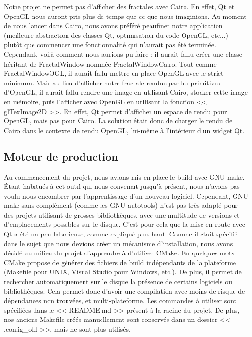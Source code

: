 \documentclass[11pt]{article}
\begin{document}
Notre projet ne permet pas d'afficher des fractales avec Cairo. En effet, Qt et
OpenGL nous auront pris plus de temps que ce que nous imaginions. Au moment de
nous lancer dans Cairo, nous avons préféré peaufiner notre application
(meilleure abstraction des classes Qt, optimisation du code OpenGL, etc...)
plutôt que commencer une fonctionnalité qui n'aurait pas été terminée.
Cependant, voilà comment nous aurions pu faire : il aurait fallu créer une
classe héritant de FractalWindow nommée FractalWindowCairo. Tout comme
FractalWindowOGL, il aurait fallu mettre en place OpenGL avec le strict minimum.
Mais au lieu d'afficher notre fractale rendue par les primitives d'OpenGL, il
aurait fallu rendre une image en utilisant Cairo, stocker cette image en
mémoire, puis l'afficher avec OpenGL en utilisant la fonction << glTexImage2D
>>. En effet, Qt permet d'afficher un espace de rendu pour OpenGL, mais pas pour
Cairo. La solution était donc de charger le rendu de Cairo dans le contexte de
rendu OpenGL, lui-même à l'intérieur d'un widget Qt.

\subsection{Moteur de production}

Au commencement du projet, nous avions mis en place le build avec GNU make.
Étant habitués à cet outil qui nous convenait jusqu'à présent, nous n'avons pas
voulu nous encombrer par l'apprentissage d'un nouveau logiciel. Cependant, GNU
make sans complément (comme les GNU autotools) n'est pas très adapté pour des
projets utilisant de grosses bibliothèques, avec une multitude de versions et
d'emplacements possibles sur le disque. C'est pour cela que la mise en route
avec Qt a été un peu laborieuse, comme expliqué plus haut. Comme il était
spécifié dans le sujet que nous devions créer un mécanisme d'installation, nous
avons décidé au milieu du projet d'apprendre à d'utiliser CMake. En quelques
mots, CMake propose de générer des fichiers de build indépendants de la
plateforme (Makefile pour UNIX, Visual Studio pour Windows, etc.). De plus, il
permet de rechercher automatiquement sur le disque la présence de certains
logiciels ou bibliothèques. Cela permet donc d'avoir une compilation avec moins
de risque de dépendances non trouvées, et multi-plateforme. Les commandes à
utiliser sont spécifiées dans le << README.md >> présent à la racine du projet.
De plus, nos anciens Makefile créés manuellement sont conservés dans un dossier
<< .config\_old >>, mais ne sont plus utilisés.
\end{document}
